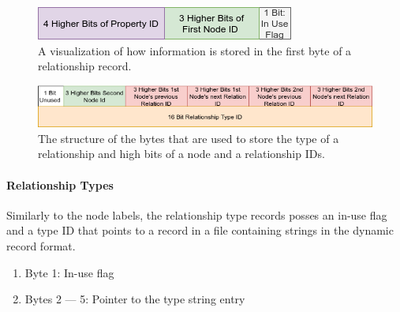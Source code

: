                 \begin{figure}[htp]\label{rel_first_byte}
                    \begin{center}
                        \includegraphics[keepaspectratio,width=\textwidth]{img/03_record/relationship/relationship_first_byte.png}
                    \end{center}
                    \caption{A visualization of how information is stored in the first byte of a relationship record.} %
                \end{figure}

                \begin{figure}[htp]\label{rel_type_bytes}
                    \begin{center}
                        \includegraphics[keepaspectratio,width=\textwidth]{img/03_record/relationship/relationship_type_bytes.png}
                    \end{center}
                    \caption{The structure of the bytes that are used to store the type of a relationship and high bits of a node and a relationship IDs.} %
                \end{figure}
            

            \paragraph{Relationship Types}
                Similarly to the node labels, the relationship type records posses an in-use flag and a type ID that points to a record in a file containing strings in the dynamic record format.
                \begin{enumerate}
                    \item Byte 1: In-use flag
                    \item Bytes 2 --- 5: Pointer to the type string entry
                \end{enumerate}
            
